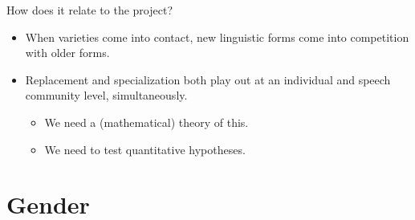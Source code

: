 \documentclass[hyperref={pdfpagelabels=false}]{beamer}
\begin{document}

\begin{frame}{How does it relate to the project?}
		\begin{itemize}
			\item When varieties come into contact, new linguistic forms come into competition with older forms.
			\item Replacement and specialization both play out at an individual and speech community level, simultaneously.
			\begin{itemize}
				\item We need a (mathematical) theory of this.
				\item We need to test quantitative hypotheses.
			\end{itemize}
		\end{itemize}
\end{frame}

\section{Gender} 
\end{document}

